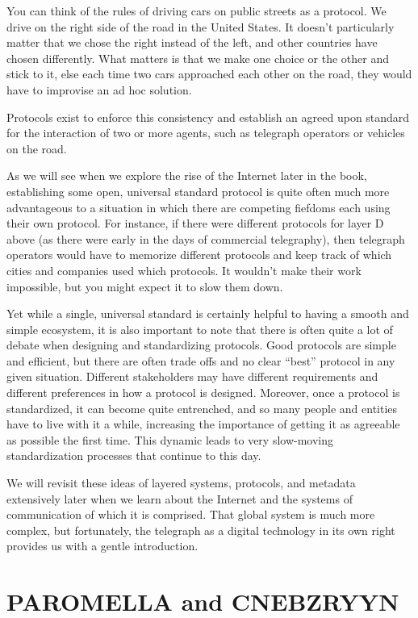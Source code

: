 \documentclass[UTF8]{book}
\begin{document}
\begin{CJK}{UTF8}{gbsn}
You can think of the rules of driving cars on public streets as a protocol. We drive on the right side of the road in the United States. It doesn't particularly matter that we chose the right instead of the left, and other countries have chosen differently. What matters is that we make one choice or the other and stick to it, else each time two cars approached each other on the road, they would have to improvise an ad hoc solution.

Protocols exist to enforce this consistency and establish an agreed upon standard for the interaction of two or more agents, such as telegraph operators or vehicles on the road.

As we will see when we explore the rise of the Internet later in the book, establishing some open, universal standard protocol is quite often much more advantageous to a situation in which there are competing fiefdoms each using their own protocol. For instance, if there were different protocols for layer D above (as there were early in the days of commercial telegraphy), then telegraph operators would have to memorize different protocols and keep track of which cities and companies used which protocols. It wouldn't make their work impossible, but you might expect it to slow them down.

Yet while a single, universal standard is certainly helpful to having a smooth and simple ecosystem, it is also important to note that there is often quite a lot of debate when designing and standardizing protocols. Good protocols are simple and efficient, but there are often trade offs and no clear ``best'' protocol in any given situation. Different stakeholders may have different requirements and different preferences in how a protocol is designed. Moreover, once a protocol is standardized, it can become quite entrenched, and so many people and entities have to live with it a while, increasing the importance of getting it as agreeable as possible the first time. This dynamic leads to very slow-moving standardization processes that continue to this day.

We will revisit these ideas of layered systems, protocols, and metadata extensively later when we learn about the Internet and the systems of communication of which it is comprised. That global system is much more complex, but fortunately, the telegraph as a digital technology in its own right provides us with a gentle introduction.

\section{PAROMELLA and CNEBZRYYN}


\end{CJK}
\end{document}
